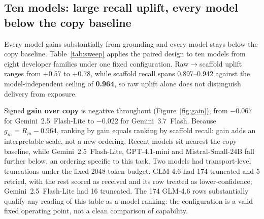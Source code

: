 \documentclass[10pt,twocolumn]{article}
\begin{document}
\subsection{Ten models: large recall uplift, every model below the copy baseline}\label{sec:tenmodel}
Every model gains substantially from grounding and every model stays below the copy baseline. Table~\ref{tab:sweep} applies the paired design to ten models from eight developer families under one fixed configuration. Raw$\to$scaffold uplift ranges from $+0.57$ to $+0.78$, while scaffold recall spans 0.897--0.942 against the model-independent ceiling of \textbf{0.964}, so raw uplift alone does not distinguish delivery from exposure.

Signed \textbf{gain over copy} is negative throughout (Figure~\ref{fig:gain}), from $-0.067$ for Gemini~2.5~Flash-Lite to $-0.022$ for Gemini~3.7~Flash. Because $g_m=R_m-0.964$, ranking by gain equals ranking by scaffold recall: gain adds an interpretable scale, not a new ordering. Recent models sit nearest the copy baseline, while Gemini~2.5~Flash-Lite, GPT-4.1-mini and Mistral-Small-24B fall further below, an ordering specific to this task. Two models had transport-level truncations under the fixed 2048-token budget. GLM-4.6 had 174 truncated and 5 retried, with the rest scored as received and its row treated as lower-confidence; Gemini~2.5~Flash-Lite had 16 truncated. The 174 GLM-4.6 rows substantially qualify any reading of this table as a model ranking: the configuration is a valid fixed operating point, not a clean comparison of capability.
\end{document}
